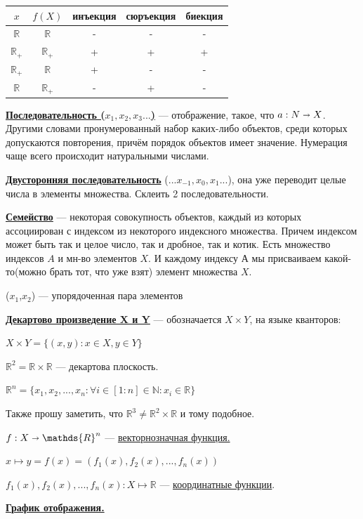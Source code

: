 \documentclass{article}
\newcommand{\deff}[1]{\underline{\textbf{#1}}}
\begin{document}
\begin{tabular}{ |c|c|c|c|c|  }
 \hline
 $x$ & $f(X)$ & инъекция & сюръекция & биекция\\
 \hline
 $\mathds{R}$ & $\mathds{R}$ & - & - & -\\
 \hline
  $\mathds{R}_+$ & $\mathds{R}_+$ & + & + & +\\
 \hline
 $\mathds{R}_+$ & $\mathds{R}$ & + & - & -\\
 \hline
 $\mathds{R}$ & $\mathds{R}_+$ & - & + & -\\
 \hline
\end{tabular}


\deff{Последовательность ($x_1,x_2,x_3...$)}  --- отображение, такое, что $a:N \shortrightarrow X$. Другими словами пронумерованный набор каких-либо объектов, среди которых допускаются повторения, причём порядок объектов имеет значение. Нумерация чаще всего происходит натуральными числами.

\deff{Двусторонняя последовательность} ($...x_{-1},x_0,x_1...$), она уже переводит целые числа в элементы множества. Склеить 2 последовательности.

\deff{Семейство} --- некоторая совокупность объектов, каждый из которых ассоциирован с индексом из некоторого индексного множества. Причем индексом может быть так и целое число, так и дробное, так и котик. Есть множество индексов $A$ и мн-во элементов $X$. И каждому индексу $А$ мы присваиваем какой-то(можно брать тот, что уже взят) элемент множества $X$.

($x_1$,$x_2$) ---  упорядоченная пара элементов

\deff{Декартово произведение X и Y} --- обозначается $X \times Y$, на языке кванторов:

 $X \times Y = \{(x,y):x \in X, y \in Y\}$ 

 $\mathds{R}^{2} = \mathds{R}\times \mathds{R}$ --- декартова плоскость.

 $\mathds{R}^{n} = \{x_1,x_2,...,x_n: \forall i \in [1:n] \in \mathds{N}:x_i \in \mathds{R}\}$

Также прошу заметить, что 
 $\mathds{R}^{3} \neq \mathds{R}^2 \times \mathds{R}$ и тому подобное.

$f: X \shortrightarrow \mathds{R}^{n} $ --- \uline{векторнозначная функция.}

$x \mapsto y = f(x) = (f_1(x),f_2(x),...,f_n(x))$

$f_1(x),f_2(x),...,f_n(x): X \mapsto \mathds{R}$ --- \uline{координатные функции}.

\deff{График отображения.} 
\end{document}
